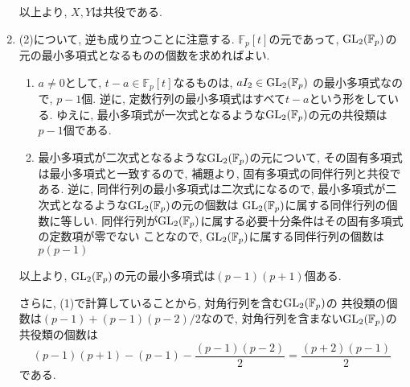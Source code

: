 \documentclass[dvipdfmx]{jsarticle}
\begin{document}
\begin{enumerate}
        以上より, $X, Y$は共役である.
        \item (2)について, 逆も成り立つことに注意する.
        $\mathbb{F}_p[t]$の元であって, $\operatorname{GL}_2(\mathbb{F}_p)$の元の最小多項式となるものの個数を求めればよい.
        \begin{enumerate}
            \item $a \neq 0$として, $t-a \in \mathbb{F}_p[t]$なるものは, $aI_2 \in \operatorname{GL}_2(\mathbb{F}_p)$
            の最小多項式なので, $p-1$個.
            逆に, 定数行列の最小多項式はすべて$t-a$という形をしている.
            ゆえに, 最小多項式が一次式となるような$\operatorname{GL}_2(\mathbb{F}_p)$の元の共役類は$p-1$個である.
            \item
            最小多項式が二次式となるような$\operatorname{GL}_2(\mathbb{F}_p)$の元について,
            その固有多項式は最小多項式と一致するので, 補題より,
            固有多項式の同伴行列と共役である.
            逆に, 同伴行列の最小多項式は二次式になるので,
            最小多項式が二次式となるような$\operatorname{GL}_2(\mathbb{F}_p)$の元の個数は
            $\operatorname{GL}_2(\mathbb{F}_p)$に属する同伴行列の個数に等しい.
            同伴行列が$\operatorname{GL}_2(\mathbb{F}_p)$に属する必要十分条件はその固有多項式の定数項が零でない
            ことなので, $\operatorname{GL}_2(\mathbb{F}_p)$に属する同伴行列の個数は$p(p-1)$
        \end{enumerate}
        以上より, $\operatorname{GL}_2(\mathbb{F}_p)$の元の最小多項式は$(p-1)(p+1)$個ある.

        さらに, (1)で計算していることから, 対角行列を含む$\operatorname{GL}_2(\mathbb{F}_p)$の
        共役類の個数は$(p-1) + (p-1)(p-2)/2$なので,
        対角行列を含まない$\operatorname{GL}_2(\mathbb{F}_p)$の共役類の個数は
        \[
            (p-1)(p+1) - (p-1) - \frac{(p-1)(p-2)}{2} = \frac{(p+2)(p-1)}{2}
        \]
        である.
    \end{enumerate}
\end{document}
